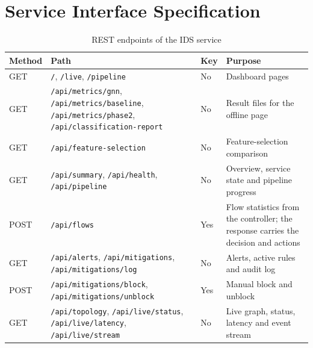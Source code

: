 \section{Service Interface Specification}
\begin{table}[htbp]
\centering
\caption{REST endpoints of the IDS service}
\label{tab:api}
\small
\begin{tabularx}{\textwidth}{|p{2.0cm}|p{4.3cm}|p{1.6cm}|X|}
\hline
\textbf{Method} & \textbf{Path} & \textbf{Key} & \textbf{Purpose} \\ \hline
GET & \texttt{/}, \texttt{/live}, \texttt{/pipeline} & No & Dashboard pages \\ \hline
GET & \texttt{/api/metrics/gnn}, \texttt{/api/metrics/baseline}, \texttt{/api/metrics/phase2}, \texttt{/api/classification-report} & No & Result files for the offline page \\ \hline
GET & \texttt{/api/feature-selection} & No & Feature-selection comparison \\ \hline
GET & \texttt{/api/summary}, \texttt{/api/health}, \texttt{/api/pipeline} & No & Overview, service state and pipeline progress \\ \hline
POST & \texttt{/api/flows} & Yes & Flow statistics from the controller; the response carries the decision and actions \\ \hline
GET & \texttt{/api/alerts}, \texttt{/api/mitigations}, \texttt{/api/mitigations/log} & No & Alerts, active rules and audit log \\ \hline
POST & \texttt{/api/mitigations/block}, \texttt{/api/mitigations/unblock} & Yes & Manual block and unblock \\ \hline
GET & \texttt{/api/topology}, \texttt{/api/live/status}, \texttt{/api/live/latency}, \texttt{/api/live/stream} & No & Live graph, status, latency and event stream \\ \hline
\end{tabularx}
\end{table}


